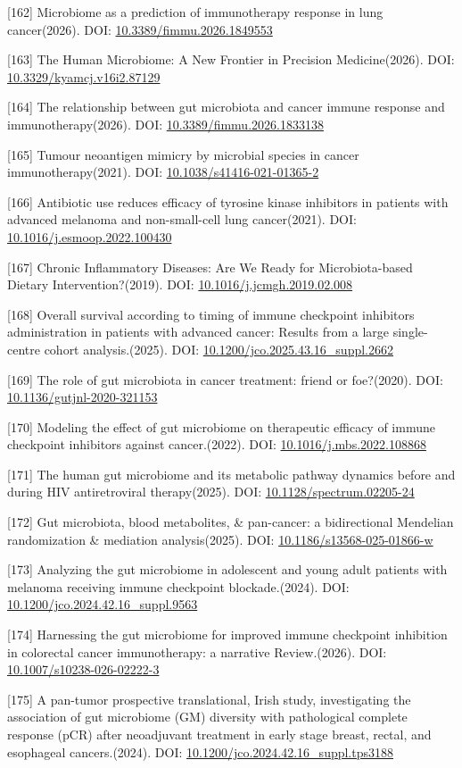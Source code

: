 {[}162{]} Microbiome as a prediction of immunotherapy response in lung cancer(2026). DOI: \url{10.3389/fimmu.2026.1849553}

{[}163{]} The Human Microbiome: A New Frontier in Precision Medicine(2026). DOI: \url{10.3329/kyamcj.v16i2.87129}

{[}164{]} The relationship between gut microbiota and cancer immune response and immunotherapy(2026). DOI: \url{10.3389/fimmu.2026.1833138}

{[}165{]} Tumour neoantigen mimicry by microbial species in cancer immunotherapy(2021). DOI: \url{10.1038/s41416-021-01365-2}

{[}166{]} Antibiotic use reduces efficacy of tyrosine kinase inhibitors in patients with advanced melanoma and non-small-cell lung cancer(2021). DOI: \url{10.1016/j.esmoop.2022.100430}

{[}167{]} Chronic Inflammatory Diseases: Are We Ready for Microbiota-based Dietary Intervention?(2019). DOI: \url{10.1016/j.jcmgh.2019.02.008}

{[}168{]} Overall survival according to timing of immune checkpoint inhibitors administration in patients with advanced cancer: Results from a large single-centre cohort analysis.(2025). DOI: \url{10.1200/jco.2025.43.16_suppl.2662}

{[}169{]} The role of gut microbiota in cancer treatment: friend or foe?(2020). DOI: \url{10.1136/gutjnl-2020-321153}

{[}170{]} Modeling the effect of gut microbiome on therapeutic efficacy of immune checkpoint inhibitors against cancer.(2022). DOI: \url{10.1016/j.mbs.2022.108868}

{[}171{]} The human gut microbiome and its metabolic pathway dynamics before and during HIV antiretroviral therapy(2025). DOI: \url{10.1128/spectrum.02205-24}

{[}172{]} Gut microbiota, blood metabolites, \& pan-cancer: a bidirectional Mendelian randomization \& mediation analysis(2025). DOI: \url{10.1186/s13568-025-01866-w}

{[}173{]} Analyzing the gut microbiome in adolescent and young adult patients with melanoma receiving immune checkpoint blockade.(2024). DOI: \url{10.1200/jco.2024.42.16_suppl.9563}

{[}174{]} Harnessing the gut microbiome for improved immune checkpoint inhibition in colorectal cancer immunotherapy: a narrative Review.(2026). DOI: \url{10.1007/s10238-026-02222-3}

{[}175{]} A pan-tumor prospective translational, Irish study, investigating the association of gut microbiome (GM) diversity with pathological complete response (pCR) after neoadjuvant treatment in early stage breast, rectal, and esophageal cancers.(2024). DOI: \url{10.1200/jco.2024.42.16_suppl.tps3188}

